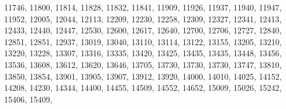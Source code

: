\documentclass[10pt,]{krantz}
\makeatletter
\newenvironment{Shaded}{\begin{snugshade}}{\end{snugshade}}
\newcommand{\DecValTok}[1]{\textcolor[rgb]{0.00,0.00,0.81}{{#1}}}
\newcommand{\NormalTok}[1]{{#1}}
\newenvironment{kframe}{%
\medskip{}
\setlength{\fboxsep}{.8em}
 \def\at@end@of@kframe{}%
 \ifinner\ifhmode%
  \def\at@end@of@kframe{\end{minipage}}%
  \begin{minipage}{\columnwidth}%
 \fi\fi%
 \def\FrameCommand##1{\hskip\@totalleftmargin \hskip-\fboxsep
 \colorbox{shadecolor}{##1}\hskip-\fboxsep
     \hskip-\linewidth \hskip-\@totalleftmargin \hskip\columnwidth}%
 \MakeFramed {\advance\hsize-\width
   \@totalleftmargin\z@ \linewidth\hsize
   \@setminipage}}%
 {\par\unskip\endMakeFramed%
 \at@end@of@kframe}
\renewenvironment{Shaded}{\begin{kframe}}{\end{kframe}}
\makeatother
\begin{document}
\begin{Shaded}
\begin{Highlighting}[]
\DecValTok{11746}\NormalTok{, }\DecValTok{11800}\NormalTok{, }\DecValTok{11814}\NormalTok{, }\DecValTok{11828}\NormalTok{, }\DecValTok{11832}\NormalTok{, }\DecValTok{11841}\NormalTok{, }\DecValTok{11909}\NormalTok{, }\DecValTok{11926}\NormalTok{, }\DecValTok{11937}\NormalTok{, }
\DecValTok{11940}\NormalTok{, }\DecValTok{11947}\NormalTok{, }\DecValTok{11952}\NormalTok{, }\DecValTok{12005}\NormalTok{, }\DecValTok{12044}\NormalTok{, }\DecValTok{12113}\NormalTok{, }\DecValTok{12209}\NormalTok{, }\DecValTok{12230}\NormalTok{, }\DecValTok{12258}\NormalTok{, }
\DecValTok{12309}\NormalTok{, }\DecValTok{12327}\NormalTok{, }\DecValTok{12341}\NormalTok{, }\DecValTok{12413}\NormalTok{, }\DecValTok{12433}\NormalTok{, }\DecValTok{12440}\NormalTok{, }\DecValTok{12447}\NormalTok{, }\DecValTok{12530}\NormalTok{, }\DecValTok{12600}\NormalTok{, }
\DecValTok{12617}\NormalTok{, }\DecValTok{12640}\NormalTok{, }\DecValTok{12700}\NormalTok{, }\DecValTok{12706}\NormalTok{, }\DecValTok{12727}\NormalTok{, }\DecValTok{12840}\NormalTok{, }\DecValTok{12851}\NormalTok{, }\DecValTok{12851}\NormalTok{, }\DecValTok{12937}\NormalTok{,}
\DecValTok{13019}\NormalTok{, }\DecValTok{13040}\NormalTok{, }\DecValTok{13110}\NormalTok{, }\DecValTok{13114}\NormalTok{, }\DecValTok{13122}\NormalTok{, }\DecValTok{13155}\NormalTok{, }\DecValTok{13205}\NormalTok{, }\DecValTok{13210}\NormalTok{, }\DecValTok{13220}\NormalTok{, }
\DecValTok{13228}\NormalTok{, }\DecValTok{13307}\NormalTok{, }\DecValTok{13316}\NormalTok{, }\DecValTok{13335}\NormalTok{, }\DecValTok{13420}\NormalTok{, }\DecValTok{13425}\NormalTok{, }\DecValTok{13435}\NormalTok{, }\DecValTok{13435}\NormalTok{, }\DecValTok{13448}\NormalTok{, }
\DecValTok{13456}\NormalTok{, }\DecValTok{13536}\NormalTok{, }\DecValTok{13608}\NormalTok{, }\DecValTok{13612}\NormalTok{, }\DecValTok{13620}\NormalTok{, }\DecValTok{13646}\NormalTok{, }\DecValTok{13705}\NormalTok{, }\DecValTok{13730}\NormalTok{, }\DecValTok{13730}\NormalTok{, }
\DecValTok{13730}\NormalTok{, }\DecValTok{13747}\NormalTok{, }\DecValTok{13810}\NormalTok{, }\DecValTok{13850}\NormalTok{, }\DecValTok{13854}\NormalTok{, }\DecValTok{13901}\NormalTok{, }\DecValTok{13905}\NormalTok{, }\DecValTok{13907}\NormalTok{, }\DecValTok{13912}\NormalTok{,}
\DecValTok{13920}\NormalTok{, }\DecValTok{14000}\NormalTok{, }\DecValTok{14010}\NormalTok{, }\DecValTok{14025}\NormalTok{, }\DecValTok{14152}\NormalTok{, }\DecValTok{14208}\NormalTok{, }\DecValTok{14230}\NormalTok{, }\DecValTok{14344}\NormalTok{, }\DecValTok{14400}\NormalTok{, }
\DecValTok{14455}\NormalTok{, }\DecValTok{14509}\NormalTok{, }\DecValTok{14552}\NormalTok{, }\DecValTok{14652}\NormalTok{, }\DecValTok{15009}\NormalTok{, }\DecValTok{15026}\NormalTok{, }\DecValTok{15242}\NormalTok{, }\DecValTok{15406}\NormalTok{, }\DecValTok{15409}\NormalTok{, }

\end{Highlighting}
\end{Shaded}
\end{document}
